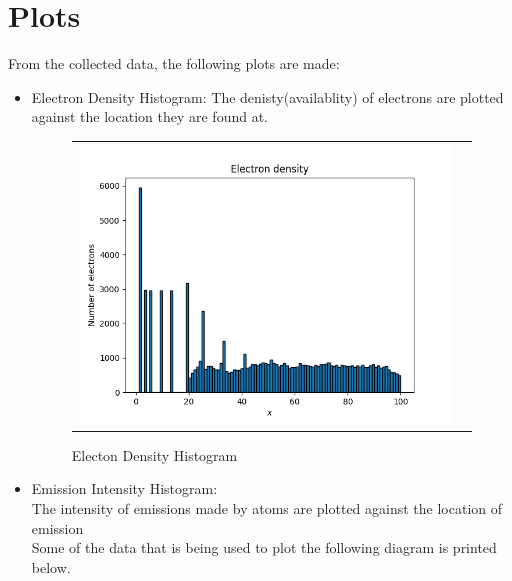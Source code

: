 \documentclass[11pt, a4paper]{article}
\begin{document}
    
	
        
        \section{Plots}
	From the collected data, the following plots are made:\\
	\begin{itemize}
	\item
	
	Electron Density Histogram:
	The denisty(availablity) of electrons are plotted against the location they are found at.
             \begin{figure}[H]
                    \centering
                    \setlength\tabcolsep{2pt}
                    \begin{tabular}{cc}
                       \includegraphics[scale=0.9]{Figure 1.png}
                    \end{tabular}
                    \caption{Electon Density Histogram} 
                \end{figure}
                
 	\item	
	 Emission Intensity Histogram:
	 \\The intensity of emissions made by atoms are plotted against the location of emission
	 \\Some of the data that is being used to plot the following diagram is printed below.
	 
         
	 

\end{itemize}
\end{document}
